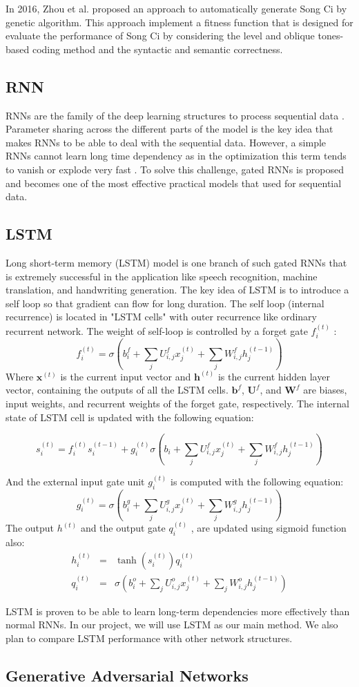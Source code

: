 In 2016, Zhou et al.\cite{zhou2010genetic} proposed an approach to automatically generate Song Ci by genetic algorithm.
%
This approach implement a fitness function that is designed for evaluate the performance of Song Ci by considering the level and oblique tones-based coding method and the syntactic and semantic correctness.


\subsection{RNN}
%
%
RNNs are the family of the deep learning structures to process sequential data  \cite{rumelhart1986}.
%
Parameter sharing across the different parts of the model is the key idea that makes RNNs to be able to deal with the sequential data.
%
However, a simple RNNs cannot learn long time dependency as in the optimization this term tends to vanish or explode very fast \cite{goodfellow2016deeplearning}.
%
To solve this challenge, gated RNNs is proposed and becomes one of the most effective practical models that used for sequential data.

\subsection{LSTM}
Long short-term memory (LSTM) model \cite{hochreiter1997lstm} is one branch of such gated RNNs that is extremely successful in the application like speech recognition, machine translation, and handwriting generation.
%
The key idea of LSTM is to introduce a self loop so that gradient can flow for long duration. The self loop (internal recurrence) is located in "LSTM cells" with outer recurrence like ordinary recurrent network. The weight of self-loop is controlled by a forget gate \(f_i^{(t)}\)
:
\[f_i^{(t)} = \sigma (b_i^f + \sum_{j}U_{i,j}^f x_j^{(t)} +\sum_{j}W_{i,j}^f h_j^{(t-1)} ) \]
Where \(\boldsymbol{x}^{(t)}\) is the current input vector and \(\boldsymbol{h}^{(t)}\) is the current hidden layer vector, containing the outputs of all the LSTM cells. \(\boldsymbol{b}^f\), \(\boldsymbol{U}^f\), and \(\boldsymbol{W}^f\) are biases, input weights, and recurrent weights of the forget gate, respectively. The internal state of LSTM cell is updated with the following equation:
\begin{small}
\[s_i^{(t)} = f_i^{(t)}s_i^{(t-1)}+g_i^{(t)}\sigma(b_i + \sum_{j}U_{i,j}^f x_j^{(t)} +\sum_{j}W_{i,j}^f h_j^{(t-1)} )\]
\end{small}
And the external input gate unit
\(g_i^{(t)} \)
is computed with the following equation:
\[g_i^{(t)} = \sigma (b_i^g + \sum_{j}U_{i,j}^g x_j^{(t)} +\sum_{j}W_{i,j}^g h_j^{(t-1)} ) \]
The output
\(h^{(t)}\)
and the output gate
\(q_i^{(t)}\)
, are updated using sigmoid function also:
\begin{eqnarray*}
h_i^{(t)} &=& \tanh (s_i^{(t)})q_i^{(t)}\\
q_i^{(t)} &=& \sigma (b_i^o + \sum_{j}U_{i,j}^o x_j^{(t)} +\sum_{j}W_{i,j}^o h_j^{(t-1)} )
\end{eqnarray*}

LSTM is proven to be able to learn long-term dependencies more effectively than normal RNNs. In our project, we will use LSTM as our main method. We also plan to compare LSTM performance with other network structures.

\subsection{Generative Adversarial Networks}
